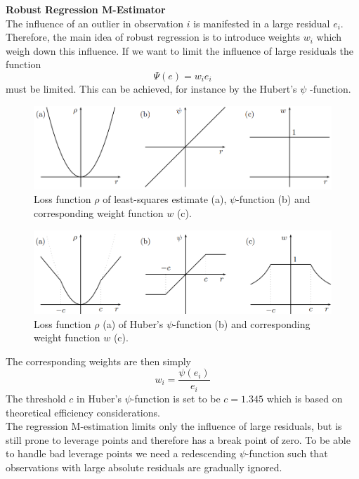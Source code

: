 \textbf{Robust Regression M-Estimator}\\
The influence of an outlier in observation $i$ is manifested in a large residual $e_i$. Therefore, the main idea of robust regression is to introduce weights $w_i$ which weigh down this influence. If we want to limit the influence of large residuals the function
\begin{equation}
  \Psi(e) = w_i e_i
\end{equation}
must be limited. This can be achieved, for instance by the Hubert's $\psi$ -function.
\begin{figure}[H]
  \centering
  \includegraphics[width=0.9\linewidth]{Pics/10.4.1.png}
  \caption{Loss function $\rho$ of least-squares estimate (a), $\psi$-function (b) and corresponding weight function $w$ (c).}
\end{figure}
\begin{figure}[H]
  \centering
  \includegraphics[width=0.9\linewidth]{Pics/10.4.2.png}
  \caption{Loss function $\rho$ (a) of Huber’s $\psi$-function (b) and corresponding weight function $w$ (c).}
\end{figure}
The corresponding weights are then simply
\begin{equation}
  w_i = \frac{\psi (e_i)}{e_i}
\end{equation}
The threshold $c$ in Huber’s $\psi$-function is set to be $c = 1.345$ which is based on theoretical efficiency considerations.\\
The regression M-estimation limits only the influence of large residuals, but is still prone to leverage points and therefore has a break point of zero. To be able to handle bad leverage points we need a redescending $\psi$-function such that observations with large absolute residuals are gradually ignored.\\


